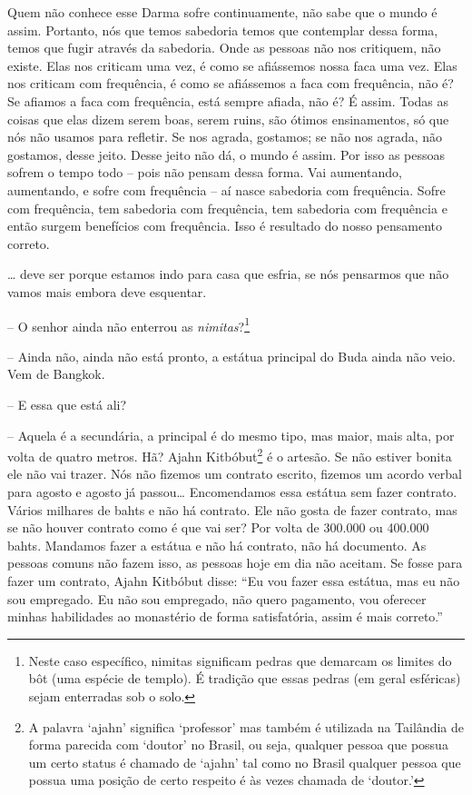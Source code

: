 Quem não conhece esse Darma sofre continuamente, não sabe que o
mundo é assim. Portanto, nós que temos sabedoria temos que contemplar
dessa forma, temos que fugir através da sabedoria. Onde as pessoas não
nos critiquem, não existe. Elas nos criticam uma vez, é como se
afiássemos nossa faca uma vez. Elas nos criticam com frequência, é como
se afiássemos a faca com frequência, não é? Se afiamos a faca com
frequência, está sempre afiada, não é? É assim. Todas as coisas que
elas dizem serem boas, serem ruins, são ótimos ensinamentos, só que nós
não usamos para refletir. Se nos agrada, gostamos; se não nos agrada,
não gostamos, desse jeito. Desse jeito não dá, o mundo é assim. Por
isso as pessoas sofrem o tempo todo – pois não pensam dessa forma. Vai
aumentando, aumentando, e sofre com frequência – aí nasce sabedoria com
frequência. Sofre com frequência, tem sabedoria com frequência, tem
sabedoria com frequência e então surgem benefícios com frequência. Isso
é resultado do nosso pensamento correto.

\ldots{} deve ser porque estamos indo para casa que esfria, se nós
pensarmos que não vamos mais embora deve esquentar. 

-- O senhor ainda não enterrou as \emph{nimitas}?\footnote{Neste
caso específico, nimitas significam pedras que demarcam os limites do
bôt (uma espécie de templo). É tradição que essas pedras (em geral
esféricas) sejam enterradas sob o solo.}

-- Ainda não, ainda não está pronto, a estátua principal do Buda
ainda não veio. Vem de Bangkok.

-- E essa que está ali?

-- Aquela é a secundária, a principal é do mesmo tipo, mas maior,
mais alta, por volta de quatro metros. Hã? Ajahn Kitbóbut\footnote{A
palavra ‘ajahn’ significa ‘professor’ mas também é utilizada na
Tailândia de forma parecida com ‘doutor’ no Brasil, ou seja, qualquer
pessoa que possua um certo status é chamado de ‘ajahn’ tal como no
Brasil qualquer pessoa que possua uma posição de certo respeito é às
vezes chamada de ‘doutor.’} é o artesão. Se não estiver bonita ele não
vai trazer. Nós não fizemos um contrato escrito, fizemos um acordo
verbal para agosto e agosto já passou\ldots{} Encomendamos essa estátua sem
fazer contrato. Vários milhares de bahts e não há contrato. Ele não
gosta de fazer contrato, mas se não houver contrato como é que vai ser?
Por volta de 300.000 ou 400.000 bahts. Mandamos fazer a estátua e não
há contrato, não há documento. As pessoas comuns não fazem isso, as
pessoas hoje em dia não aceitam. Se fosse para fazer um contrato, Ajahn
Kitbóbut disse: “Eu vou fazer essa estátua, mas eu não sou empregado.
Eu não sou empregado, não quero pagamento, vou oferecer minhas
habilidades ao monastério de forma satisfatória, assim é mais correto.”


